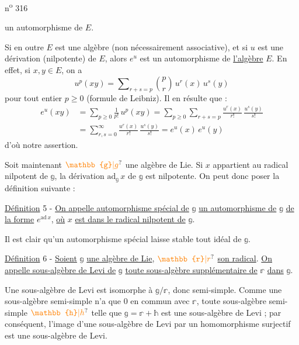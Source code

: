 \hfill n\textsuperscript{o} 316

un automorphisme de $E$.

Si en outre $E$ est une algèbre (non nécessairement associative), et si $u$ est une dérivation (nilpotente) de $E$, alors $e^u$ est un automorphisme de \uline{l'algèbre} $E$. En effet, si $x,y\in E$, on a
\[
u^p(xy)=\sum\nolimits_{r+s=p}\binom{p}{r}\,u^r(x)\,u^s(y)
\]
pour tout entier $p\geqslant 0$ (formule de Leibniz). Il en résulte que :
\[
\begin{aligned}
e^u(xy)&=\sum\nolimits_{p\geqslant 0}\frac{1}{p!}\,u^p(xy)
=\sum\nolimits_{p\geqslant 0}\sum\nolimits_{r+s=p}\frac{u^r(x)}{r!}\,\frac{u^s(y)}{s!}\\
&=\sum\nolimits_{r,s=0}^{\infty}\frac{u^r(x)}{r!}\,\frac{u^s(y)}{s!}
=e^u(x)\,e^u(y)
\end{aligned}
\]
d'où notre assertion.

Soit maintenant $\unsure{\mathbb{g}|g}$ une algèbre de Lie. Si $x$ appartient au radical nilpotent de $\mathbb{g}$, la dérivation $\mathrm{ad}_{\mathbb{g}}\,x$ de $\mathbb{g}$ est nilpotente. On peut donc poser la définition suivante :

\uline{Définition} 5 - \uline{On appelle automorphisme spécial de} $\mathbb{g}$ \uline{un automorphisme de} $\mathbb{g}$ \uline{de la forme} $e^{\mathrm{ad}\,x}$, \uline{où} $x$ \uline{est dans le radical nilpotent de} $\mathbb{g}$.

Il est clair qu'un automorphisme spécial laisse stable tout idéal de $\mathbb{g}$.

\uline{Définition} 6 - \uline{Soient} $\mathbb{g}$ \uline{une algèbre de Lie}, $\unsure{\mathbb{r}|r}$ \uline{son radical}. \uline{On appelle sous-algèbre de Levi de} $\mathbb{g}$ \uline{toute sous-algèbre supplémentaire de} $\mathbb{r}$ \uline{dans} $\mathbb{g}$.

Une sous-algèbre de Levi est isomorphe à $\mathbb{g}/\mathbb{r}$, donc semi-simple. Comme une sous-algèbre semi-simple n'a que $0$ en commun avec $\mathbb{r}$, toute sous-algèbre semi-simple $\unsure{\mathbb{h}|h}$ telle que $\mathbb{g}=\mathbb{r}+\mathbb{h}$ est une sous-algèbre de Levi ; par conséquent, l'image d'une sous-algèbre de Levi par un homomorphisme surjectif est une sous-algèbre de Levi.
